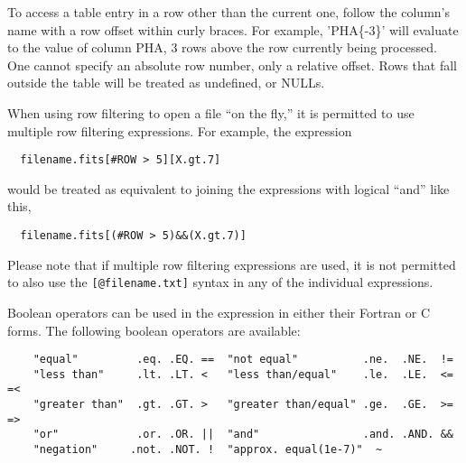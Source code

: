\documentclass[11pt]{book}
\begin{document}
    To access a table entry in a row other  than the current one, follow
    the  column's name  with  a row  offset  within  curly  braces.  For
    example, 'PHA\{-3\}' will evaluate to the value  of column PHA, 3 rows
    above  the  row currently  being processed.   One  cannot specify an
    absolute row number, only a relative offset.  Rows that fall outside
    the table will be treated as undefined, or NULLs.

    When using row filtering to open a file ``on the fly,'' it is permitted
    to use multiple row filtering expressions.  For example, the expression
\begin{verbatim}
  filename.fits[#ROW > 5][X.gt.7]
\end{verbatim}
would be treated as equivalent to joining the expressions with logical ``and''
like this,
\begin{verbatim}
  filename.fits[(#ROW > 5)&&(X.gt.7)]
\end{verbatim}
Please note that if multiple row filtering expressions are used, it is
not permitted to also use the \verb+[@filename.txt]+ syntax in any
of the individual expressions.
    


    Boolean   operators can be  used in  the expression  in either their
    Fortran or C forms.  The following boolean operators are available:

\begin{verbatim}
    "equal"         .eq. .EQ. ==  "not equal"          .ne.  .NE.  !=
    "less than"     .lt. .LT. <   "less than/equal"    .le.  .LE.  <= =<
    "greater than"  .gt. .GT. >   "greater than/equal" .ge.  .GE.  >= =>
    "or"            .or. .OR. ||  "and"                .and. .AND. &&
    "negation"     .not. .NOT. !  "approx. equal(1e-7)"  ~
\end{verbatim}
\end{document}
